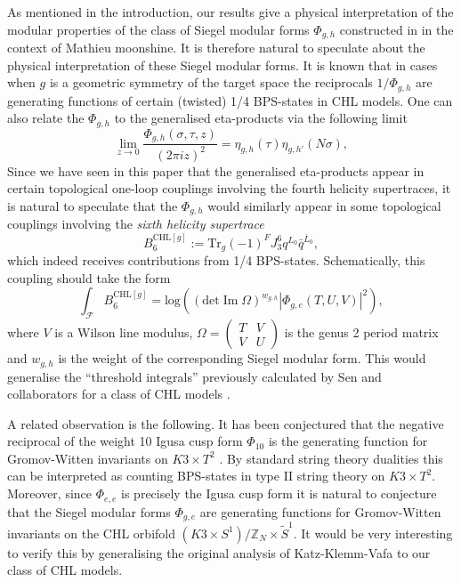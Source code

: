 \documentclass[a4paper,11pt]{article}
\DeclareMathOperator{\im}{Im}
\numberwithin{equation}{section}
\def\be{\begin{equation}}
\def\ee{\end{equation}}
\begin{document}
As mentioned in the introduction, our results  give a physical interpretation of the modular properties of the class of Siegel modular forms $\Phi_{g,h}$ constructed in \cite{Persson:2013xpa} in the context of Mathieu moonshine. It is therefore natural to speculate about the physical interpretation of these Siegel modular forms. It is known that in cases when $g$ is a geometric symmetry of the target space the reciprocals $1/\Phi_{g, h}$ are generating functions of certain (twisted) 1/4 BPS-states in CHL models. One can also relate the $\Phi_{g,h}$ to the generalised eta-products via the following limit
\be \lim_{z\to 0}\frac{\Phi_{g,h}(\sigma,\tau,z)}{(2\pi iz)^2}=\eta_{g,h}(\tau)\eta_{g,h'}(N\sigma),
\ee
Since we have seen in this paper that the generalised eta-products appear in certain topological one-loop couplings involving the fourth helicity supertraces, it is natural to speculate that the $\Phi_{g,h}$ would similarly appear in some topological couplings involving the \emph{sixth helicity supertrace} 
\be
B_6^{\text{CHL}[g]}:=\text{Tr}_g(-1)^{F} J_3^6 q^{L_0} \bar{q}^{\bar{L}_0},
\ee
which indeed receives contributions from 1/4 BPS-states. Schematically, this coupling should take the form \cite{Kawai:1995hy}
\be
\int_{\mathcal{F}} B_6^{\text{CHL}[g]} = \text{log} \left((\text{det}\im \Omega)^{w_{g,h}} |\Phi_{g,e}(T, U, V)|^2\right),
\ee
where $V$ is a Wilson line modulus, $\Omega =  \left(\begin{smallmatrix}
T & V \\ V & U
\end{smallmatrix}\right)$ is the genus 2 period matrix and $w_{g,h}$ is the weight of the corresponding Siegel modular form. This would generalise the ``threshold integrals'' previously calculated by Sen and collaborators for a class of CHL models \cite{David:2006ji,David:2006yn,Sen:2010ts}.  

A related observation is the following. It has been conjectured that the negative reciprocal of the weight 10 Igusa cusp form $\Phi_{10}$ is the generating function for Gromov-Witten invariants on $K3\times T^2$  \cite{Katz:1999xq,2014arXiv1404.6698P,2014arXiv1411.1514O}. By standard string theory dualities this can be interpreted as counting BPS-states in type II string theory on $K3\times T^2$. Moreover, since $\Phi_{e,e}$ is precisely the Igusa cusp form it is natural to conjecture that the Siegel modular forms $\Phi_{g,e}$ are generating functions for Gromov-Witten invariants on the CHL orbifold $(K3\times S^1)/\mathbb{Z}_N \times \tilde{S}^1$. It would be very interesting to verify this by  generalising the original analysis of Katz-Klemm-Vafa \cite{Katz:1999xq} to our class of CHL models.
\end{document}

